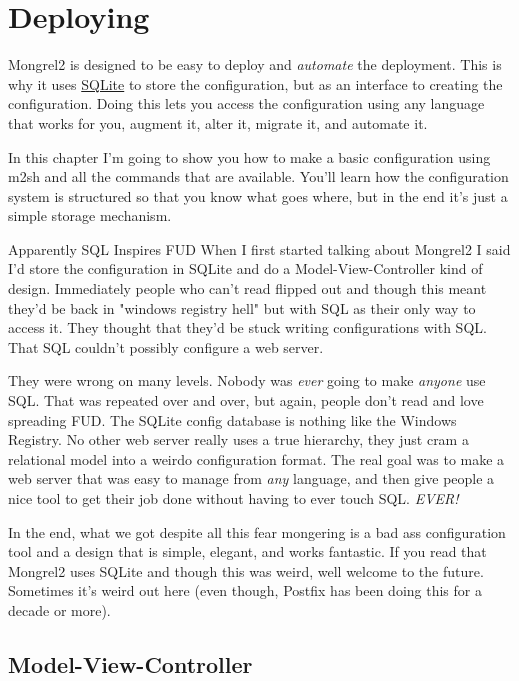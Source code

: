 \chapter{Deploying}

Mongrel2 is designed to be easy to deploy and \emph{automate} the deployment.
This is why it uses \href{http://www.sqlite.org/}{SQLite} to store the configuration,
but  as an interface to creating the configuration.  Doing this lets
you access the configuration using any language that works for you, augment it,
alter it, migrate it, and automate it.

In this chapter I'm going to show you how to make a basic configuration using
m2sh and all the commands that are available.  You'll learn how the configuration
system is structured so that you know what goes where, but in the end it's just
a simple storage mechanism.

\begin{aside}{Apparently SQL Inspires FUD}
When I first started talking about Mongrel2 I said I'd store the configuration
in SQLite and do a Model-View-Controller kind of design.  Immediately people who
can't read flipped out and though this meant they'd be back in "windows registry hell"
but with SQL as their only way to access it.  They thought that they'd be stuck writing
configurations with SQL.  That SQL couldn't possibly configure a web server.

They were wrong on many levels.  Nobody was \emph{ever} going to make \emph{anyone} use
SQL.  That was repeated over and over, but again, people don't read and love spreading
FUD.  The SQLite config database is nothing like the Windows Registry.  No other web
server really uses a true hierarchy, they just cram a relational model into a weirdo
configuration format.  The real goal was to make a web server that was easy to manage from
\emph{any} language, and then give people a nice tool to get their job done without
having to ever touch SQL.  \emph{EVER!}

In the end, what we got despite all this fear mongering is a bad ass configuration
tool and a design that is simple, elegant, and works fantastic.  If you read that
Mongrel2 uses SQLite and though this was weird, well welcome to the future.  Sometimes
it's weird out here (even though, Postfix has been doing this for a decade or more).
\end{aside}


\section{Model-View-Controller}

